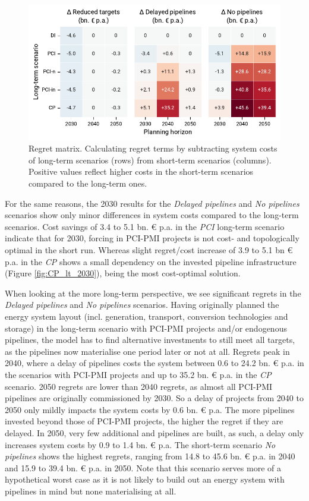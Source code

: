\documentclass[preprint,12pt,sort&compress]{elsarticle}
\begin{document}
\begin{figure}[htbp]
  \centering
  \includegraphics[width=\textwidth]{regret_matrix}
  \caption{Regret matrix. Calculating regret terms by subtracting system costs of long-term scenarios (rows) from short-term scenarios (columns). Positive values reflect higher costs in the short-term scenarios compared to the long-term ones.}
  \label{fig:regret_matrix_results}
\end{figure}

For the same reasons, the 2030 results for the \textit{Delayed pipelines} and \textit{No pipelines} scenarios show only minor differences in system costs compared to the long-term scenarios. Cost savings of 3.4 to 5.1 bn. \euro{} p.a. in the \textit{PCI} long-term scenario indicate that for 2030, forcing in PCI-PMI projects is not cost- and topologically optimal in the short run. Whereas slight regret/cost increase of 3.9 to 5.1 bn \euro{} p.a. in the \textit{CP} shows a small dependency on the invested pipeline infrastructure (Figure \ref{fig:CP_lt_2030}), being the most cost-optimal solution.

When looking at the more long-term perspective, we see significant regrets in the \textit{Delayed pipelines} and \textit{No pipelines} scenarios. Having originally planned the energy system layout (incl. generation, transport, conversion technologies and storage) in the long-term scenario with PCI-PMI projects and/or endogenous pipelines, the model has to find alternative investments to still meet all targets, as the pipelines now materialise one period later or not at all. Regrets peak in 2040, where a delay of pipelines costs the system between 0.6 to 24.2 bn. \euro{} p.a. in the scenarios with PCI-PMI projects and up to 35.2 bn. \euro{} p.a. in the \textit{CP} scenario. 2050 regrets are lower than 2040 regrets, as almost all PCI-PMI pipelines are originally commissioned by 2030. So a delay of projects from 2040 to 2050 only mildly impacts the system costs by 0.6 bn. \euro{} p.a. The more pipelines invested beyond those of PCI-PMI projects, the higher the regret if they are delayed. In 2050, very few additional  and  pipelines are built, as such, a delay only increases system costs by 0.9 to 1.4 bn. \euro{} p.a. 
The short-term scenario \textit{No pipelines} shows the highest regrets, ranging from 14.8 to 45.6 bn. \euro{} p.a. in 2040 and 15.9 to 39.4 bn. \euro{} p.a. in 2050. Note that this scenario serves more of a hypothetical worst case as it is not likely to build out an energy system with pipelines in mind but none materialising at all.
\end{document}
